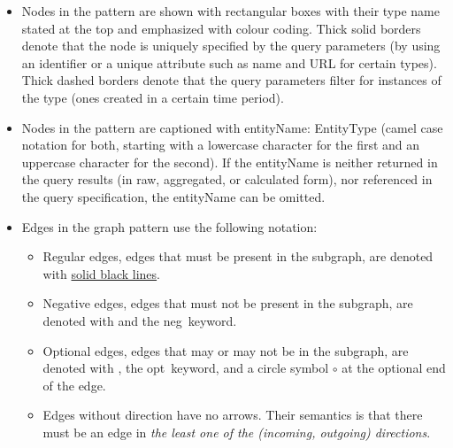 \begin{itemize}
	\item Nodes in the pattern are shown with rectangular boxes with their type name stated at the top and emphasized with colour coding.
	Thick solid borders denote that the node is uniquely specified by the query parameters (\eg by using an identifier or a unique attribute such as \textsf{name} and \textsf{URL} for certain types). Thick dashed borders denote that the query parameters filter for instances of the type (\eg ones created in a certain time period).
	\item Nodes in the pattern are captioned with \textsf{entityName: EntityType} (camel case 
	notation for both, starting with a lowercase character for the first and an 
	uppercase character for the second). If the \textsf{entityName} is neither returned in the query results (in raw, aggregated, or calculated form), nor referenced in the query specification, the \textsf{entityName} can be omitted.
	\item Edges in the graph pattern use the following notation:
	\begin{itemize}
		\item Regular edges, \ie edges that must be present in the subgraph, are denoted with \uline{solid black lines}.
		\item Negative edges, \ie edges that must not be present in the subgraph, are denoted with \textcolor{red}{} and the \guillemotleft neg\guillemotright\ keyword.
		\item Optional edges, \ie edges that may or may not be in the subgraph, are denoted with , the \guillemotleft opt\guillemotright\ keyword, and a circle symbol $\circ$ at the optional end of the edge.
		\item Edges without direction have no arrows. Their semantics is that there must be an edge in \emph{the least one of the (incoming, outgoing) directions}.
	\end{itemize}


\end{itemize}
